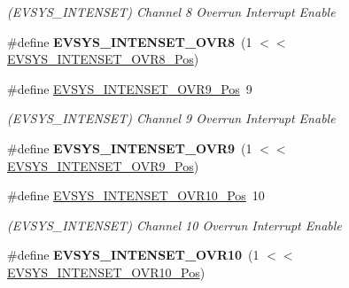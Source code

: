 \begin{DoxyCompactItemize}
\begin{DoxyCompactList}\small\item\em (E\+V\+S\+Y\+S\+\_\+\+I\+N\+T\+E\+N\+S\+E\+T) Channel 8 Overrun Interrupt Enable \end{DoxyCompactList}\item 
\hypertarget{group___s_a_m_l21___e_v_s_y_s_ga0e3a5331e715ad721df09b3c230fedbd}{}\#define {\bfseries E\+V\+S\+Y\+S\+\_\+\+I\+N\+T\+E\+N\+S\+E\+T\+\_\+\+O\+V\+R8}~(1 $<$$<$ \hyperlink{group___s_a_m_l21___e_v_s_y_s_ga3c10a5ddd0e57bb5a58184d869a4f134}{E\+V\+S\+Y\+S\+\_\+\+I\+N\+T\+E\+N\+S\+E\+T\+\_\+\+O\+V\+R8\+\_\+\+Pos})\label{group___s_a_m_l21___e_v_s_y_s_ga0e3a5331e715ad721df09b3c230fedbd}

\item 
\hypertarget{group___s_a_m_l21___e_v_s_y_s_gaec6392298233da7a5efc5880ab14131f}{}\#define \hyperlink{group___s_a_m_l21___e_v_s_y_s_gaec6392298233da7a5efc5880ab14131f}{E\+V\+S\+Y\+S\+\_\+\+I\+N\+T\+E\+N\+S\+E\+T\+\_\+\+O\+V\+R9\+\_\+\+Pos}~9\label{group___s_a_m_l21___e_v_s_y_s_gaec6392298233da7a5efc5880ab14131f}

\begin{DoxyCompactList}\small\item\em (E\+V\+S\+Y\+S\+\_\+\+I\+N\+T\+E\+N\+S\+E\+T) Channel 9 Overrun Interrupt Enable \end{DoxyCompactList}\item 
\hypertarget{group___s_a_m_l21___e_v_s_y_s_gacf728aa209af5af6563f565617abd938}{}\#define {\bfseries E\+V\+S\+Y\+S\+\_\+\+I\+N\+T\+E\+N\+S\+E\+T\+\_\+\+O\+V\+R9}~(1 $<$$<$ \hyperlink{group___s_a_m_l21___e_v_s_y_s_gaec6392298233da7a5efc5880ab14131f}{E\+V\+S\+Y\+S\+\_\+\+I\+N\+T\+E\+N\+S\+E\+T\+\_\+\+O\+V\+R9\+\_\+\+Pos})\label{group___s_a_m_l21___e_v_s_y_s_gacf728aa209af5af6563f565617abd938}

\item 
\hypertarget{group___s_a_m_l21___e_v_s_y_s_ga3c09fd231a51336268fa4a1418365af7}{}\#define \hyperlink{group___s_a_m_l21___e_v_s_y_s_ga3c09fd231a51336268fa4a1418365af7}{E\+V\+S\+Y\+S\+\_\+\+I\+N\+T\+E\+N\+S\+E\+T\+\_\+\+O\+V\+R10\+\_\+\+Pos}~10\label{group___s_a_m_l21___e_v_s_y_s_ga3c09fd231a51336268fa4a1418365af7}

\begin{DoxyCompactList}\small\item\em (E\+V\+S\+Y\+S\+\_\+\+I\+N\+T\+E\+N\+S\+E\+T) Channel 10 Overrun Interrupt Enable \end{DoxyCompactList}\item 
\hypertarget{group___s_a_m_l21___e_v_s_y_s_ga2ec2bbb2bf8f47d088bf7e60656c2927}{}\#define {\bfseries E\+V\+S\+Y\+S\+\_\+\+I\+N\+T\+E\+N\+S\+E\+T\+\_\+\+O\+V\+R10}~(1 $<$$<$ \hyperlink{group___s_a_m_l21___e_v_s_y_s_ga3c09fd231a51336268fa4a1418365af7}{E\+V\+S\+Y\+S\+\_\+\+I\+N\+T\+E\+N\+S\+E\+T\+\_\+\+O\+V\+R10\+\_\+\+Pos})\label{group___s_a_m_l21___e_v_s_y_s_ga2ec2bbb2bf8f47d088bf7e60656c2927}


\end{DoxyCompactItemize}
